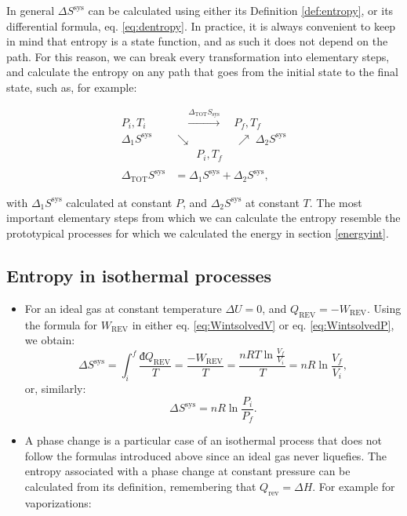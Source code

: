 \documentclass[
  9pt,
]{extbook}
\theoremstyle{definition}
\theoremstyle{definition}
\theoremstyle{definition}
\theoremstyle{remark}
\begin{document}
In general \(\Delta S^{\mathrm{sys}}\) can be calculated using either its Definition \ref{def:entropy}, or its differential formula, eq. \eqref{eq:dentropy}. In practice, it is always convenient to keep in mind that entropy is a state function, and as such it does not depend on the path. For this reason, we can break every transformation into elementary steps, and calculate the entropy on any path that goes from the initial state to the final state, such as, for example:

\begin{equation}
\begin{aligned}
P_i, T_i & \quad \xrightarrow{ \Delta_{\text{TOT}} S_{\text{sys}} } \quad P_f, T_f \\
  \scriptstyle{\Delta_1 S^{\text{sys}}} & \searrow \qquad  \qquad \nearrow \; \scriptstyle{\Delta_2 S^{\text{sys}}} \\
& \qquad P_i, T_f \\
\\
\Delta_{\text{TOT}} S^{\text{sys}} & = \Delta_1 S^{\text{sys}} + \Delta_2 S^{\text{sys}},
\end{aligned}
\label{eq:entropycycle}
\end{equation}

with \(\Delta_1 S^{\text{sys}}\) calculated at constant \(P\), and \(\Delta_2 S^{\text{sys}}\) at constant \(T\). The most important elementary steps from which we can calculate the entropy resemble the prototypical processes for which we calculated the energy in section \ref{energyint}.

\hypertarget{entropy-in-isothermal-processes}{%
\subsection{Entropy in isothermal processes}\label{entropy-in-isothermal-processes}}

\begin{itemize}
\item
  For an ideal gas at constant temperature \(\Delta U =0\), and \(Q_{\mathrm{REV}} = -W_{\mathrm{REV}}\). Using the formula for \(W_{\mathrm{REV}}\) in either eq. \eqref{eq:WintsolvedV} or eq. \eqref{eq:WintsolvedP}, we obtain:
  \begin{equation}
  \Delta S^{\mathrm{sys}} = \int_i^f \frac{đQ_{\mathrm{REV}}}{T} = \frac{-W_{\mathrm{REV}}}{T} = \frac{nRT \ln \frac{V_f}{V_i}}{T} = nR \ln \frac{V_f}{V_i},
  \label{eq:sigconsttV}
  \end{equation}
  or, similarly:
  \begin{equation}
  \Delta S^{\mathrm{sys}} = nR \ln \frac{P_i}{P_f}.
  \label{eq:sigconsttP}
  \end{equation}
\item
  A phase change is a particular case of an isothermal process that does not follow the formulas introduced above since an ideal gas never liquefies. The entropy associated with a phase change at constant pressure can be calculated from its definition, remembering that \(Q_{\mathrm{rev}}= \Delta H\). For example for vaporizations:
\end{itemize}
\end{document}

